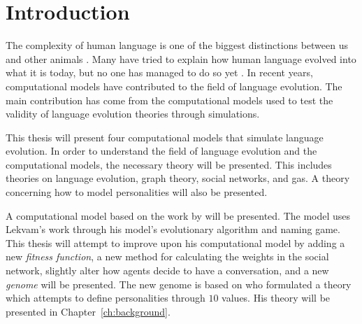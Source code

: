 \acresetall
\chapter{Introduction}
The complexity of human language is one of the biggest distinctions between us and other animals \citep{hauser2002faculty}. Many have tried to explain how human language evolved into what it is today, but no one has managed to do so yet \citep{chomsky1986knowledge, pinker1990natural, muller1861theoretical}. In recent years, computational models have contributed to the field of language evolution. The main contribution has come from the computational models used to test the validity of language evolution theories through simulations.

This thesis will present four computational models that simulate language evolution. In order to understand the field of language evolution and the computational models, the necessary theory will be presented. This includes theories on language evolution, graph theory, social networks, and \acp{ga}. A theory concerning how to model personalities will also be presented.

A computational model based on the work by \citeauthor{lekvam2014co} will be presented. The model uses Lekvam's work through his model's evolutionary algorithm and naming game. This thesis will attempt to improve upon his computational model by adding a new \textit{fitness function}, a new method for calculating the weights in the social network, slightly alter how agents decide to have a conversation, and a new \textit{genome} will be presented. The new genome is based on \citet{schwartz1992unniversals} who formulated a theory which attempts to define personalities through $10$ values. His theory will be presented in Chapter~\ref{ch:background}.




